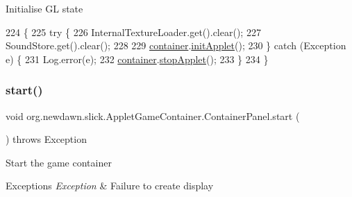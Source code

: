 Initialise GL state 
\begin{DoxyCode}
224                               \{
225          \textcolor{keywordflow}{try} \{
226             InternalTextureLoader.get().clear();
227             SoundStore.get().clear();
228 
229             \mbox{\hyperlink{classorg_1_1newdawn_1_1slick_1_1_applet_game_container_1_1_container_panel_a205433c30651024b8b0ba19894a080f6}{container}}.\mbox{\hyperlink{classorg_1_1newdawn_1_1slick_1_1_applet_game_container_1_1_container_ac6699a7594b3c6512ab612b3e1421246}{initApplet}}();
230          \} \textcolor{keywordflow}{catch} (Exception e) \{
231             Log.error(e);
232             \mbox{\hyperlink{classorg_1_1newdawn_1_1slick_1_1_applet_game_container_1_1_container_panel_a205433c30651024b8b0ba19894a080f6}{container}}.\mbox{\hyperlink{classorg_1_1newdawn_1_1slick_1_1_applet_game_container_1_1_container_a9e11859f475dfad8eb146c894b7cf814}{stopApplet}}();
233          \}
234       \}
\end{DoxyCode}
\mbox{\label{classorg_1_1newdawn_1_1slick_1_1_applet_game_container_1_1_container_panel_af7a71499be1ee871ac8ec833a3cbec90}} 
\subsubsection{\texorpdfstring{start()}{start()}}
{\footnotesize\ttfamily void org.\+newdawn.\+slick.\+Applet\+Game\+Container.\+Container\+Panel.\+start (\begin{DoxyParamCaption}{ }\end{DoxyParamCaption}) throws Exception\hspace{0.3cm}{\ttfamily [inline]}}

Start the game container


\begin{DoxyExceptions}{Exceptions}
{\em Exception} & Failure to create display \\
\hline
\end{DoxyExceptions}


